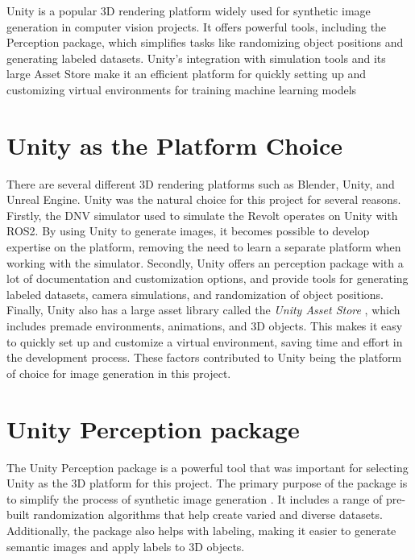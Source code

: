 Unity is a popular 3D rendering platform widely used for synthetic image generation in computer vision projects. It offers powerful tools, including the Perception package\cite{unity-perception2022}, which simplifies tasks like randomizing object positions and generating labeled datasets. Unity's integration with simulation tools and its large Asset Store \cite{UnityAssetStore} make it an efficient platform for quickly setting up and customizing virtual environments for training machine learning models

\section{Unity as the Platform Choice}
There are several different 3D rendering platforms such as Blender, Unity, and Unreal Engine. Unity was the natural choice for this project for several reasons. Firstly, the DNV simulator used to simulate the Revolt operates on Unity with ROS2.\cite{dnv_wiki} By using Unity to generate images, it becomes possible to develop expertise on the platform, removing the need to learn a separate platform when working with the simulator. Secondly, Unity offers an perception package \cite{unity-perception2022} with a lot of documentation and customization options, and provide tools for generating labeled datasets, camera simulations, and randomization of object positions. Finally, Unity also has a large asset library called the \textit{Unity Asset Store} \cite{UnityAssetStore}, which includes premade environments, animations, and 3D objects. This makes it easy to quickly set up and customize a virtual environment, saving time and effort in the development process. These factors contributed to Unity being the platform of choice for image generation in this project.


\section{Unity Perception package}
The Unity Perception package \cite{unity-perception2022} is a powerful tool that was important for selecting Unity as the 3D platform for this project. The primary purpose of the package is to simplify the process of synthetic image generation \cite{borkman2021unityperceptiongeneratesynthetic}. It includes a range of pre-built randomization algorithms that help create varied and diverse datasets. Additionally, the package also helps with labeling, making it easier to generate semantic images and apply labels to 3D objects.


